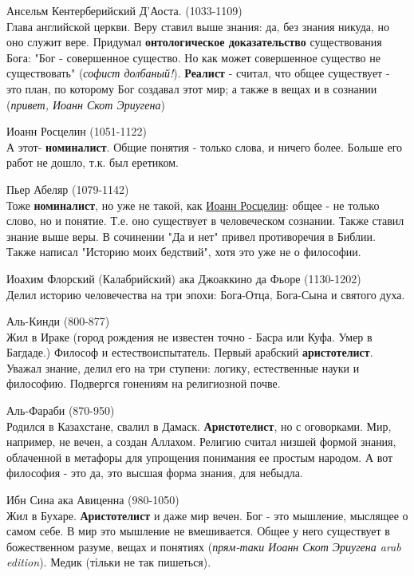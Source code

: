 Ансельм Кентерберийский Д'Аоста. (1033-1109)\\
Глава английской церкви. Веру ставил выше знания: да, без знания никуда, но оно служит вере. Придумал \textbf{онтологическое доказательство} существования Бога: "Бог - совершенное существо. Но как может совершенное существо не существовать" (\textit{софист долбаный!}). \textbf{Реалист} - считал, что общее существует  - это план, по которому Бог создавал этот мир; а также в вещах и в сознании (\textit{привет, Иоанн Скот Эриугена})

Иоанн Росцелин (1051-1122)\\
А этот- \textbf{номиналист}. Общие понятия - только слова, и ничего более. Больше его работ не дошло, т.к. был еретиком.

Пьер Абеляр (1079-1142)\\
Тоже \textbf{номиналист}, но уже не такой, как \underline{Иоанн Росцелин}: общее - не только слово, но и понятие. Т.е. оно существует в человеческом сознании. Также ставил знание выше веры. В сочинении "Да и нет" привел противоречия в Библии. Также написал "Историю моих бедствий", хотя это уже не о философии.

Иоахим Флорский (Калабрийский) ака Джоаккино да Фьоре  (1130-1202)\\
Делил историю человечества на три эпохи: Бога-Отца, Бога-Сына и святого духа.

Аль-Кинди (800-877)\\
Жил в Ираке (город рождения не известен точно - Басра или Куфа. Умер в Багдаде.) Философ и естествоиспытатель. Первый арабский \textbf{аристотелист}. Уважал знание, делил его на три ступени: логику, естественные науки и философию. Подвергся гонениям на религиозной почве.

Аль-Фараби (870-950)\\
Родился в Казахстане, свалил в Дамаск. \textbf{Аристотелист}, но с оговорками. Мир, например, не вечен, а создан Аллахом. Религию считал низшей формой знания, облаченной в метафоры для упрощения понимания ее простым народом. А вот философия - это да, это высшая форма знания, для небыдла.

Ибн Сина ака Авиценна (980-1050)\\
Жил в Бухаре. \textbf{Аристотелист} и даже мир вечен. Бог - это мышление, мыслящее о самом себе. В мир это мышление не вмешивается. Общее у него существует в божественном разуме, вещах и понятиях (\textit{прям-таки Иоанн Скот Эриугена arab edition}). Медик (тільки не так пишеться).


